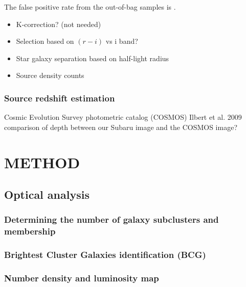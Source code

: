 \documentclass[letterpaper,useAMS,usenatbib]{mn2e}
\begin{document}
The false positive rate from the out-of-bag samples is .

\begin{itemize}
	\item K-correction? (not needed)
	\item Selection based on $(r-i)$ vs i band? 
	\item Star galaxy separation based on half-light radius 
	\item Source density counts   
\end{itemize}

\subsubsection{Source redshift estimation}
Cosmic Evolution Survey photometric catalog (COSMOS) 
Ilbert et al. 2009
comparison of depth between our Subaru image and the COSMOS image?

\section{METHOD}

\subsection{Optical analysis}
\subsubsection{Determining the number of galaxy subclusters and membership}
\subsubsection{Brightest Cluster Galaxies identification (BCG)}
\subsubsection{Number density and luminosity map}

% 
% 
% 
\end{document}
